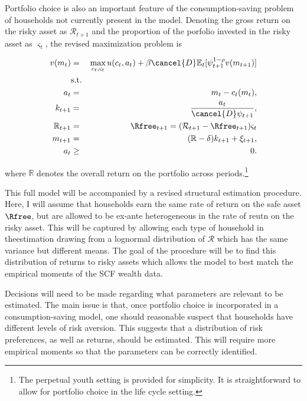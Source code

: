 \documentclass[\econtexRoot/Chp1proposal]{subfiles}
\begin{document}
\par Portfolio choice is also an important feature of the consumption-saving problem of households not currently present in the model. Denoting the gross return on the risky asset as $\mathcal{R}_{t+1}$ and the proportion of the porfolio invested in the risky asset as $\varsigma_t$, the revised maximization problem is

\begin{eqnarray*}
  v(m_t) &=& \max_{c_t, \varsigma_t} u(c_t, a_t) + \beta \cancel{D} \mathbb{E}_{t}[\psi_{t+1}^{1-\rho}v(m_{t+1})] \\
  &\text{s.t.}& \\
  a_t &=& m_t - c_t(m_t), \\
  k_{t+1} &=& \frac{a_t}{\cancel{D}\psi_{t+1}}, \\
  \mathbb{R}_{t+1} &=& \Rfree_{t+1} = (\mathcal{R}_{t+1} - \Rfree_{t+1})\varsigma_t \\
  m_{t+1} &=& (\mathbb{R} - \delta)k_{t+1} + \xi_{t+1}, \\
  a_t &\geq& 0.
\end{eqnarray*}

\par where $\mathbb{R}$ denotes the overall return on the portfolio across periods.\footnote{The perpetual youth setting is provided for simplicity. It is straightforward to allow for portfolio choice in the life cycle setting.}

\par This full model will be accompanied by a revised structural estimation procedure. Here, I will assume that households earn the same rate of return on the safe asset $\Rfree$, but are allowed to be ex-ante heterogeneous in the rate of reutn on the risky asset. This will be captured by allowing each type of household in theestimation drawing from a lognormal distribution of $\mathcal{R}$ which has the same variance but different means. The goal of the procedure will be to find this distribution of returns to risky assets which allows the model to best match the empirical moments of the SCF wealth data.

\par Decisions will need to be made regarding what parameters are relevant to be estimated. The main issue is that, once portfolio choice is incorporated in a consumption-saving model, one should reasonable suspect that households have different levels of risk aversion. This suggests that a distribution of risk preferences, as well as returns, should be estimated. This will require more empirical moments so that the parameters can be correctly identified.  
\end{document}
